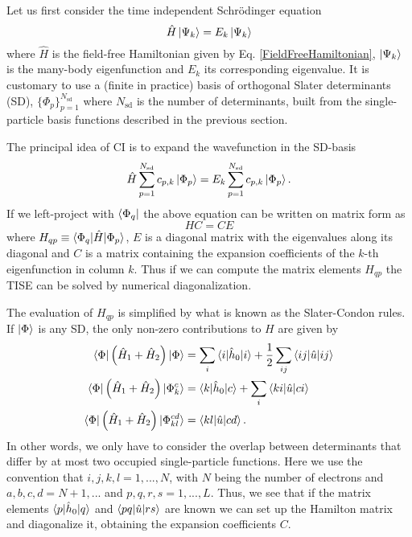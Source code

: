 \documentclass[aip,jcp,reprint,floatfix]{revtex4-1}
\begin{document}
Let us first consider the time independent Schrödinger equation 
\begin{equation}
 \hat{H} \ket{\Psi_k} = E_k \ket{\Psi_k}
\end{equation}
where $\hat{H}$ is the field-free Hamiltonian given by
Eq. \eqref{FieldFreeHamiltonian}, $\ket{\Psi_k}$ is the many-body
eigenfunction and $E_k$ its corresponding eigenvalue. It is customary
to use a (finite in practice) basis of orthogonal Slater determinants
(SD), $\{ \Phi_p \}_{p=1}^{N_{\text{sd}}}$ where $N_{\text{sd}}$ is
the number of determinants, built from the single-particle basis
functions described in the previous section.

The principal idea of CI is to expand the wavefunction in the SD-basis
\begin{equation}
 \hat{H} \sum_{p=1}^{N_{\text{sd}}} c_{p,k} \ket{\Phi_p} = E_k \sum_{p=1}^{N_{\text{sd}}} c_{p,k} \ket{\Phi_p}.
\end{equation}
If we left-project with $\bra{\Phi_q}$ the above equation can be written on matrix form as 
\begin{equation}
 HC = CE
\end{equation}
where $H_{qp} \equiv \braket{\Phi_q|\hat{H}|\Phi_p}$, $E$ is a
diagonal matrix with the eigenvalues along its diagonal and $C$ is a
matrix containing the expansion coefficients of the $k$-th
eigenfunction in column $k$. Thus if we can compute the matrix
elements $H_{qp}$ the TISE can be solved by numerical diagonalization.

The evaluation of $H_{qp}$ is simplified by what is known as the
Slater-Condon rules. If $\ket{\Phi}$ is any SD, the only non-zero
contributions to $H$ are given by
\begin{align}
 \braket{\Phi| \left(\hat{H}_1 + \hat{H}_2\right)|\Phi} &= \sum_i \braket{i|\hat{h}_0|i} + \frac{1}{2}\sum_{ij}\braket{ij|\hat{u}|ij} \label{SlaterCondonEqual}\\
 \braket{\Phi| \left(\hat{H}_1 + \hat{H}_2\right)|\Phi_k^c} &= \braket{k|\hat{h}_0|c} + \sum_{i} \braket{ki|\hat{u}|ci} \label{SlaterCondonDiffByOne} \\
 \braket{\Phi| \left(\hat{H}_1 + \hat{H}_2\right)|\Phi_{kl}^{cd}} &= \braket{kl|\hat{u}|cd} \label{SlaterCondonDiffByTwo}.
\end{align}
In other words, we only have to consider the overlap between
determinants that differ by at most two occupied single-particle
functions.  Here we use the convention that $i,j,k,l = 1,...,N$, with
$N$ being the number of electrons and $a,b,c,d = N+1,...$ and $p,q,r,s
= 1,...,L$. Thus, we see that if the matrix elements
$\braket{p|\hat{h}_0|q}$ and $\braket{pq|\hat{u}|rs}$ are known we can
set up the Hamilton matrix and diagonalize it, obtaining the expansion
coefficients $C$.
\end{document}
